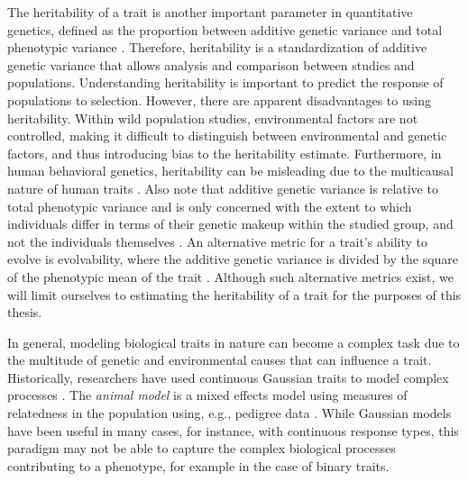 The heritability of a trait is another important parameter in quantitative genetics, defined as the proportion between additive genetic variance and total phenotypic variance \autocite{falconer1996introduction}. Therefore, heritability is a standardization of additive genetic variance that allows analysis and comparison between studies and populations.
Understanding heritability is important to predict the response of populations to selection.
However, there are apparent disadvantages to using heritability. Within wild population studies, environmental factors are not controlled, making it difficult to distinguish between environmental and genetic factors, and thus introducing bias to the heritability estimate. Furthermore, in human behavioral genetics, heritability can be misleading due to the multicausal nature of human traits \autocite{moore2017heritability}. Also note that additive genetic variance is relative to total phenotypic variance and is only concerned with the extent to which individuals differ in terms of their genetic makeup within the studied group, and not the individuals themselves \autocite{gazzaniga2010}. An alternative metric for a trait's ability to evolve is evolvability, where the additive genetic variance is divided by the square of the phenotypic mean of the trait \autocite{hansen2011}. Although such alternative metrics exist, we will limit ourselves to estimating the heritability of a trait for the purposes of this thesis.

In general, modeling biological traits in nature can become a complex task due to the multitude of genetic and environmental causes that can influence a trait. Historically, researchers have used continuous Gaussian traits to model complex processes \autocite{century_after}. The \textit{animal model} is a mixed effects model using measures of relatedness in the population using, e.g., pedigree data \autocite{kruuk2004}.
While Gaussian models have been useful in many cases, for instance, with continuous response types, this paradigm may not be able to capture the complex biological processes contributing to a phenotype, for example in the case of binary traits.

